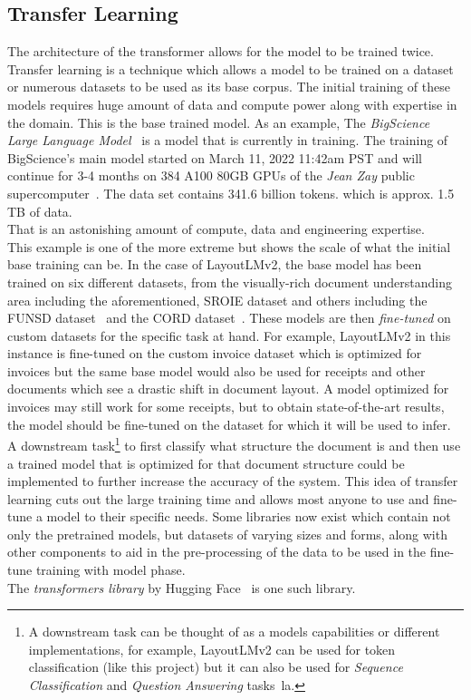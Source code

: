 \subsection{Transfer Learning}
The architecture of the transformer allows for the model to be trained twice. \\
Transfer learning is a technique which allows a model to be trained on a dataset or numerous datasets to be used as its base corpus. The initial
training of these models requires huge amount of data and compute power along with expertise in the domain.
This is the base trained model.
\bigbreak
As an example, The \emph{BigScience Large Language Model}~\autocite{BigScienceResearchWorkshop}
is a model that is currently in training. The training of BigScience's main model started on March 11, 2022 11:42am PST and will continue
for 3-4 months on 384 A100 80GB GPUs of the \emph{Jean Zay} public supercomputer~\autocite{BigscienceTr11176BmllogsHugging}. The data set
contains 341.6 billion tokens. which is approx. 1.5 TB of data.\\ That is an astonishing amount of compute, data and engineering expertise.\\
This example is one of the more extreme but shows the scale of what the initial base training can be.
\bigbreak
In the case of LayoutLMv2, the base model has been trained on six different datasets, from the
visually-rich document understanding area including the aforementioned, SROIE dataset and others including the FUNSD dataset~\autocite{FUNSD}
and the CORD dataset~\autocite{CORDConsolidatedReceipt2022}.
\bigbreak
These models are then \emph{fine-tuned} on custom datasets for the specific task at hand. For example, LayoutLMv2 in this instance is
fine-tuned on the custom invoice dataset which is optimized for invoices but the same base model would also be used for receipts and other
documents which see a drastic shift in document layout. A model optimized for invoices may still work for some receipts, but to obtain
state-of-the-art results, the model should be fine-tuned on the dataset for which it will be used to infer.\\
A downstream task\footnote{A downstream task can be thought of as a models capabilities or different implementations, for example,
	LayoutLMv2 can be used for token classification (like this project) but it can also be used for \emph{Sequence Classification}
	and \emph{Question Answering} tasks~la\autocite{LayoutLMV2}.} to first classify what structure the document is and then use a trained model that is optimized for
that document structure could be implemented to further increase the accuracy of the system.
\bigbreak
This idea of transfer learning cuts out the large training time and allows most anyone to use and fine-tune a model to their specific needs.
Some libraries now exist which contain not only the pretrained models, but datasets of varying sizes and forms, along with other components
to aid in the pre-processing of the data to be used in the fine-tune training with model phase.\\
The \emph{transformers library} by Hugging Face~\autocite{HuggingFaceAI} is one such library.

